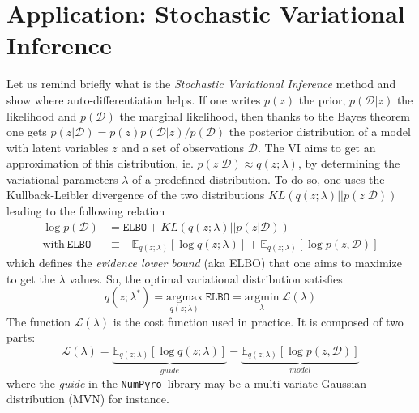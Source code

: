 \documentclass[twocolumn,twocolappendix,nofootinbib,iop]{openjournal}
\newcommand{\numpyro}{\texttt{NumPyro}}
\begin{document}
\section{Application: Stochastic Variational Inference}
\label{sec-SVI}
%
Let us remind briefly what is the \textit{Stochastic Variational Inference} method \citep{2012arXiv1206.7051H, 2017arXiv171105597Z} and show where auto-differentiation helps. If one  writes $p(z)$ the prior, $p(\mathcal{D}|z)$ the likelihood and $p(\mathcal{D})$ the marginal likelihood, then thanks to the  Bayes theorem one gets $p(z|\mathcal{D})=p(z)p(\mathcal{D}|z)/p(\mathcal{D})$ the posterior distribution of a model with latent variables $z$ and a set of observations $\mathcal{D}$. The VI aims to get an approximation of this distribution, ie. $p(z|\mathcal{D}) \approx q(z;\lambda)$, by determining the variational parameters $\lambda$ of a predefined distribution. To do so, one uses the Kullback-Leibler divergence of the two distributions $KL(q(z;\lambda)||p(z|\mathcal{D}))$ leading to the following relation
\begin{align}
\log p(\mathcal{D}) &= \mathtt{ELBO} +  KL(q(z;\lambda)||p(z|\mathcal{D})) \label{eq-ELBO} \\
\mathrm{with} \ \mathtt{ELBO} &\equiv -\mathbb{E}_{q(z;\lambda)}\left[ \log q(z;\lambda)\right] + \mathbb{E}_{q(z;\lambda)}\left[ \log p(z,\mathcal{D}) \right] 
\end{align}
which defines the \textit{evidence lower bound} (aka ELBO) that one aims to maximize to get the $\lambda$ values. So, the optimal variational distribution satisfies
\begin{equation}
q(z;\lambda^\ast) = \underset{q(z;\lambda)}{\mathrm{argmax}}\  \mathtt{ELBO} = 
\underset{\lambda}{\mathrm{argmin}}\ \mathcal{L}(\lambda)
\end{equation}
The function $\mathcal{L}(\lambda)$ is the cost function used in practice. It is composed of two parts:
\begin{equation}
\mathcal{L}(\lambda) = \underbrace{\mathbb{E}_{q(z;\lambda)}\left[ \log q(z;\lambda)\right]}_{guide} - \underbrace{\mathbb{E}_{q(z;\lambda)}\left[ \log p(z,\mathcal{D}) \right]}_{model}
\label{eq-loss-svi-1}
\end{equation}
where the \textit{guide} in the \numpyro\ library may be a multi-variate Gaussian distribution (MVN) for instance.
\end{document}

